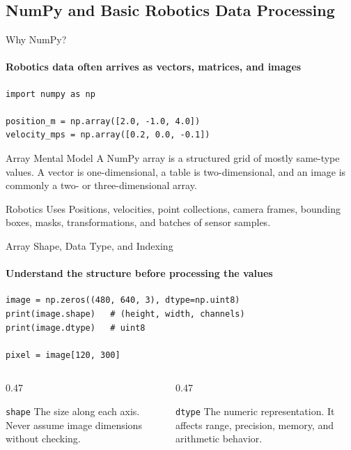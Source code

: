\subsection{NumPy and Basic Robotics Data Processing}

\begin{frame}[fragile]{Why NumPy?}
\framesubtitle{Robotics data often arrives as vectors, matrices, and images}
\begin{verbatim}
import numpy as np

position_m = np.array([2.0, -1.0, 4.0])
velocity_mps = np.array([0.2, 0.0, -0.1])
\end{verbatim}
\begin{block}{Array Mental Model}
A NumPy array is a structured grid of mostly same-type values. A vector is one-dimensional, a table is two-dimensional, and an image is commonly a two- or three-dimensional array.
\end{block}
\begin{exampleblock}{Robotics Uses}
Positions, velocities, point collections, camera frames, bounding boxes, masks, transformations, and batches of sensor samples.
\end{exampleblock}
\end{frame}

\begin{frame}[fragile]{Array Shape, Data Type, and Indexing}
\framesubtitle{Understand the structure before processing the values}
\begin{verbatim}
image = np.zeros((480, 640, 3), dtype=np.uint8)
print(image.shape)   # (height, width, channels)
print(image.dtype)   # uint8

pixel = image[120, 300]
\end{verbatim}
\begin{columns}[T,onlytextwidth]
\begin{column}{0.47\textwidth}
\begin{block}{\texttt{shape}}
The size along each axis. Never assume image dimensions without checking.
\end{block}
\end{column}
\hfill
\begin{column}{0.47\textwidth}
\begin{block}{\texttt{dtype}}
The numeric representation. It affects range, precision, memory, and arithmetic behavior.
\end{block}
\end{column}
\end{columns}
\end{frame}

